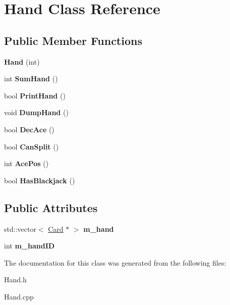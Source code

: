 \hypertarget{class_hand}{}\section{Hand Class Reference}
\label{class_hand}
\subsection*{Public Member Functions}
\begin{DoxyCompactItemize}
\item 
{\bfseries Hand} (int)\hypertarget{class_hand_abaa16c2ffcc48ac2368d79cf810df6c7}{}\label{class_hand_abaa16c2ffcc48ac2368d79cf810df6c7}

\item 
int {\bfseries Sum\+Hand} ()\hypertarget{class_hand_adf9ecdee4a292e32dfee8a2da9c00589}{}\label{class_hand_adf9ecdee4a292e32dfee8a2da9c00589}

\item 
bool {\bfseries Print\+Hand} ()\hypertarget{class_hand_a1bb9cd4961231d7708fdeea731fe5a2e}{}\label{class_hand_a1bb9cd4961231d7708fdeea731fe5a2e}

\item 
void {\bfseries Dump\+Hand} ()\hypertarget{class_hand_aed8546ecef6466d591fe292b45692f74}{}\label{class_hand_aed8546ecef6466d591fe292b45692f74}

\item 
bool {\bfseries Dec\+Ace} ()\hypertarget{class_hand_a434f32de60bcdf7c795537b361658de5}{}\label{class_hand_a434f32de60bcdf7c795537b361658de5}

\item 
bool {\bfseries Can\+Split} ()\hypertarget{class_hand_a2933483fe779dddd638b8a5b6f809bb9}{}\label{class_hand_a2933483fe779dddd638b8a5b6f809bb9}

\item 
int {\bfseries Ace\+Pos} ()\hypertarget{class_hand_aa896f7fd164af4e7221eff9e723bb4b6}{}\label{class_hand_aa896f7fd164af4e7221eff9e723bb4b6}

\item 
bool {\bfseries Has\+Blackjack} ()\hypertarget{class_hand_a248da7ed19dec483ad23b779ab7ad7af}{}\label{class_hand_a248da7ed19dec483ad23b779ab7ad7af}

\end{DoxyCompactItemize}
\subsection*{Public Attributes}
\begin{DoxyCompactItemize}
\item 
std\+::vector$<$ \hyperlink{class_card}{Card} $\ast$ $>$ {\bfseries m\+\_\+hand}\hypertarget{class_hand_a13a8d342aac9dc2f7373ea7f5a6c62c1}{}\label{class_hand_a13a8d342aac9dc2f7373ea7f5a6c62c1}

\item 
int {\bfseries m\+\_\+hand\+ID}\hypertarget{class_hand_ae9f101083045b9ef0b9d75872e550031}{}\label{class_hand_ae9f101083045b9ef0b9d75872e550031}

\end{DoxyCompactItemize}


The documentation for this class was generated from the following files\+:\begin{DoxyCompactItemize}
\item 
Hand.\+h\item 
Hand.\+cpp\end{DoxyCompactItemize}
